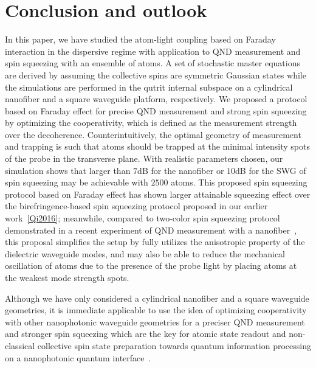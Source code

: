 \documentclass[aps,pra,twocolumn,superscriptaddress]{revtex4-1} %
\begin{document}
\section{Conclusion and outlook}
In this paper, we have studied the atom-light coupling based on Faraday interaction in the dispersive regime with application to QND measurement and spin squeezing with an ensemble of atoms. A set of stochastic master equations are derived by assuming the collective spins are symmetric Gaussian states while the simulations are performed in the qutrit internal subspace on a cylindrical nanofiber and a square waveguide platform, respectively. We proposed a protocol based on Faraday effect for precise QND measurement and strong spin squeezing by optimizing the cooperativity, which is defined as the measurement strength over the decoherence. Counterintuitively, the optimal geometry of measurement and trapping is such that atoms should be trapped at the minimal intensity spots of the probe in the transverse plane. With realistic parameters chosen, our simulation shows that larger than $ 7 $dB for the nanofiber or $ 10 $dB for the SWG of spin squeezing may be achievable with $ 2500 $ atoms. This proposed spin squeezing protocol based on Faraday effect has shown larger attainable squeezing effect over the birefringence-based spin squeezing protocol proposed in our earlier work~\ref{Qi2016}; meanwhile, compared to two-color spin squeezing protocol demonstrated in a recent experiment of QND measurement with a nanofiber~\cite{Beguin2017Observation}, this proposal simplifies the setup by fully utilizes the anisotropic property of the dielectric waveguide modes, and may also be able to reduce the mechanical oscillation of atoms due to the presence of the probe light by placing atoms at the weakest mode strength spots.

Although we have only considered a cylindrical nanofiber and a square waveguide geometries, it is immediate applicable to use the idea of optimizing cooperativity with other nanophotonic waveguide geometries for a preciser QND measurement and stronger spin squeezing which are the key for atomic state readout and non-classical collective spin state preparation towards quantum information processing on a nanophotonic quantum interface~\cite{Qi2016}.
\end{document}
